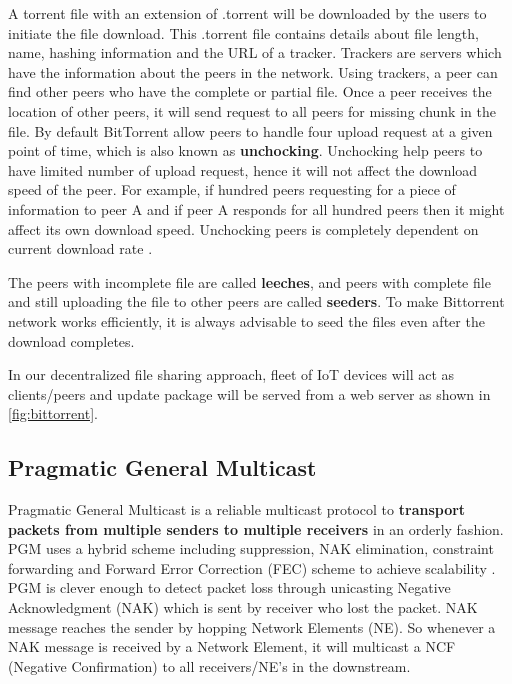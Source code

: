 \documentclass[12pt]{article}
\begin{document}

A torrent file with an extension of .torrent will be downloaded by the users to initiate the file download. This .torrent file contains details about file length, name, hashing information and the URL of a tracker. Trackers are servers which have the information about the peers in the network. Using trackers, a peer can find other peers who have the complete or partial file. Once a peer receives the location of other peers, it will send request to all peers for missing chunk in the file.  By default BitTorrent allow peers to handle four upload request at a given point of time, which is also known as \textbf{unchocking}. Unchocking help peers to have limited number of upload request, hence it will not affect the download speed of the peer. For example, if hundred peers requesting for a piece of information to peer A and if peer A responds for all hundred peers then it might affect its own download speed. Unchocking peers is completely dependent on current download rate \cite{cohen2003incentives}.   

The peers with incomplete file are called \textbf{leeches}, and peers with complete file and still uploading the file to other peers are called \textbf{seeders}. To make Bittorrent network works efficiently, it is always advisable to seed the files even after the download completes. 

In our decentralized file sharing approach, fleet of IoT devices will act as clients/peers and update package will be served from a web server as shown in \autoref{fig:bittorrent}. 


\subsection{Pragmatic General Multicast}

Pragmatic General Multicast is a reliable multicast protocol to \textbf{transport packets from multiple senders to multiple receivers} in an orderly fashion. PGM uses a hybrid scheme including suppression, NAK elimination, constraint forwarding and Forward Error Correction (FEC) scheme to achieve scalability \cite{Gemmell20021P}. PGM is clever enough to detect packet loss through unicasting Negative Acknowledgment (NAK) which is sent by receiver who lost the packet. NAK message reaches the sender by hopping Network Elements (NE). So whenever a NAK message is received by a Network Element, it will multicast a NCF (Negative Confirmation) to all receivers/NE's in the downstream. 
\end{document}

